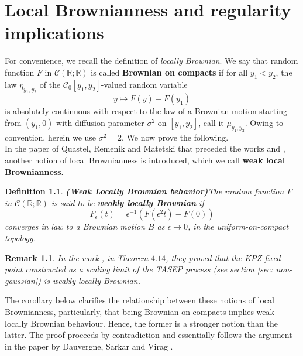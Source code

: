 \documentclass[12pt]{report}
\theoremstyle{plain}
\newtheorem*{remark}{Remark}
\newtheorem{definition}{Definition}[section]
\newcommand{\R}{\ensuremath{\mathbb{R}}}
\begin{document}
\chapter{Local Brownianness and regularity implications}
For convenience, we recall the definition of \textit{locally Brownian}. We say that random function $F$ in $\mathcal{C}(\R;\R)$ is called {\bf Brownian on compacts} if for all $y_1<y_2$, the law $\eta_{y_1, y_2}$ of the $\mathcal{C}_0[y_1,y_2]$-valued random variable
$$y\mapsto F(y)-F(y_1)$$
is absolutely continuous with respect to the law of a Brownian motion starting from $(y_1,0)$ with diffusion parameter $\sigma^2$ on $[y_1,y_2]$, call it $\mu_{y_1, y_2}$. Owing to convention, herein we use $\sigma^2=2$. We now prove the following.\\

In the paper of Quastel, Remenik and Matetski \cite{matetski2021kpz} that preceded the works \cite{DOV} and \cite{sarkar2021brownian}, another notion of local Brownianness is introduced, which we call \textbf{weak local Brownianness}. 

\begin{definition}{\bf (Weak Locally Brownian behavior)}\label{locbr}
The random function $F$ in $\mathcal{C}(\R;\R)$ is said to be \textbf{weakly locally Brownian} if 
\begin{equation}\label{eq: Brownian scaling}
F_\epsilon(t)=\epsilon^{-1}(F(\epsilon^2 t)-F(0))
\end{equation}
converges in law to a Brownian motion $B$ as $\epsilon\to 0$, in the uniform-on-compact topology.
\end{definition} 

\begin{remark}
In the work \cite{matetski2021kpz}, in Theorem $4.14$, they proved that the KPZ fixed point constructed as a scaling limit of the TASEP process (see section \ref{sec: non-gaussian}) is weakly locally Brownian.
\end{remark}

The corollary below clarifies the relationship between these notions of local Brownianness, particularly, that being Brownian on compacts implies weak locally Brownian behaviour. Hence, the former is a stronger notion than the latter. The proof proceeds by contradiction and essentially follows the argument in the paper by Dauvergne, Sarkar and Virag \cite{dauvergne2022three}.
\end{document}
